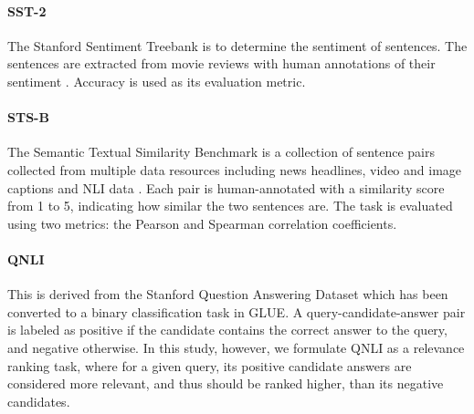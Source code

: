 \paragraph{SST-2} The Stanford Sentiment Treebank is to determine the sentiment of sentences. %
The sentences are extracted from movie reviews
with human annotations of their sentiment \cite{sst2013}. Accuracy is used as its evaluation metric.

\paragraph{STS-B}
The Semantic Textual Similarity Benchmark is a collection of sentence pairs collected from multiple data resources including news headlines, video and image captions and NLI data \cite{sts-b2017}. Each pair is human-annotated with a similarity score from 1 to 5, indicating how similar the two sentences are. 
The task is evaluated using two metrics: the Pearson and Spearman correlation coefficients.

\paragraph{QNLI}
This is derived from the Stanford Question Answering Dataset \citep{rajpurkar2016squad} 
which  has  been converted to a binary classification task in GLUE.
A query-candidate-answer pair is labeled as positive if the candidate contains the correct answer to the query, and negative otherwise. 
In this study, however, we formulate QNLI as a relevance ranking task, where for a given query, its positive candidate answers are considered more relevant, and thus should be ranked higher, than its negative candidates.


